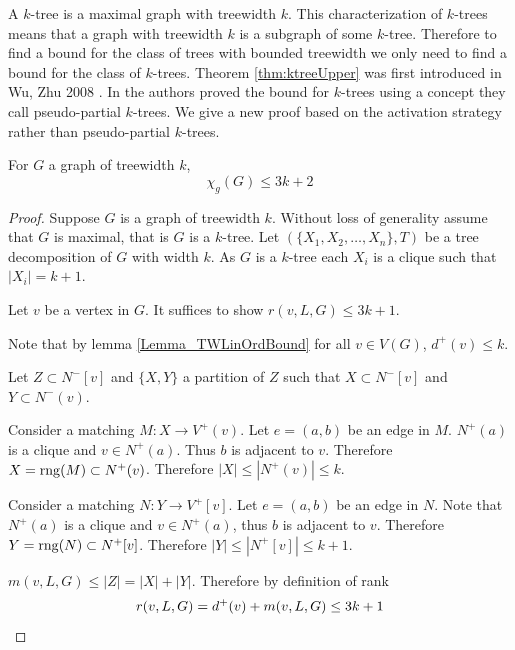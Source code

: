 
A $k$-tree is a maximal graph with treewidth $k$. This characterization of $k$-trees means that a graph with treewidth $k$ is a subgraph of some $k$-tree. Therefore to find a bound for the class of trees with bounded treewidth we only need to find a bound for the class of $k$-trees. Theorem \ref{thm:ktreeUpper} was first introduced in Wu, Zhu 2008 \cite{WuZhu2008}. In \cite{WuZhu2008} the authors proved the bound for $k$-trees using a concept they call pseudo-partial $k$-trees. We give a new proof based on the activation strategy rather than pseudo-partial $k$-trees.
\begin{theorem} \label{thm:ktreeUpper}
         For $G$ a graph of treewidth $k$,  
        \[\chi_g(G) \leq 3k + 2\]
\end{theorem}

\begin{proof}
    Suppose $G$ is a graph of treewidth $k$. Without loss of generality assume that $G$ is maximal, that is $G$ is a $k$-tree. Let $(\{X_1,X_2,\dots,X_n\},T)$ be a tree decomposition of $G$ with width $k$.
    As $G$ is a $k$-tree each $X_i$ is a clique such that $|X_i|=k+1$.
    
    Let $v$ be a vertex in $G$. It suffices to show $r(v,L,G) \leq 3k + 1$.
    
    
    Note that by lemma \ref{Lemma_TWLinOrdBound} for all $v \in V(G)$, $d^+(v) \leq k$.
    
    Let $Z \subset N^-[v]$ and $\{X,Y\}$ a partition of $Z$ such that $X\subset N^-[v]$ and $Y\subset N^-(v)$.
           
    Consider a matching $M\colon X \to V^+(v)$. Let $e=(a,b)$ be an edge in $M$.
    $N^+(a)$ is a clique and $v\in N^+(a)$. Thus $b$ is adjacent to $v$. Therefore $X =\operatorname{rng}(M)\subset N^+(v)$. Therefore $|X| \leq |N^+(v)| \leq k$. 
    
    Consider a matching $N\colon Y \to V^+[v]$. Let $e=(a,b)$ be an edge in $N$.
    Note that $N^+(a)$ is a clique and $v\in N^+(a)$, thus $b$ is adjacent to $v$. Therefore $Y =\operatorname{rng}(N)\subset N^+[v]$. Therefore $|Y| \leq |N^+[v]| \leq k+1$. 
        
    $m(v,L,G) \leq |Z| = |X|+|Y|$. Therefore by definition of rank \[r(v,L,G) = d^+(v) + m(v,L,G) \leq 3k +1 \qedhere\]        
\end{proof}

%

